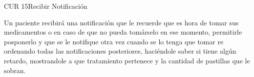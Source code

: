 \begin{UseCase}{CUR 15}{Recibir Notificación}
    {
    	Un paciente recibirá una notificación que le recuerde que es hora de tomar sus medicamentos o en caso de que no pueda tomárselo en ese momento, permitirle posponerlo y que se le notifique otra vez cuando se lo tenga que tomar re ordenando todas las notificaciones posteriores, haciéndole saber si tiene algún retardo, mostrandole a que tratamiento pertenece y la cantidad de pastillas que le sobran.
    	
    }
    

\end{UseCase}
